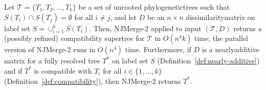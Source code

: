 \begin{theorem}
\label{thm:njmerge2-rt-correct}
Let $\mathcal{T} = \{T_1, T_2, \dots, T_k\}$ be a set of \gls{unrooted} \glspl{phylogenetictree} such that $S(T_i) \cap S(T_j) = \emptyset$ for all $i \ne j$, and let $D$ be an $n \times n$ \gls{dissimilaritymatrix}  on label set $S = \cup_{i=1}^k S(T_i)$.
Then, NJMerge-2 applied to input $(\mathcal{T}, D)$ returns a (possibly refined) compatibility supertree for $\mathcal{T}$ in $O(n^4k)$ time; the parallel version of NJMerge-2 runs in $O(n^4)$ time.
Furthermore, if $D$ is a \gls{nearlyadditive} matrix for a fully resolved tree $T^*$ on label set $S$ (Definition~\ref{def:nearly-additive}) and if $T^*$ is \gls{compatible} with $T_i$ for all $i \in \{1, \dots, k\}$ (Definition~\ref{def:compatibility}), then NJMerge-2 returns $T^*$.
\end{theorem}

